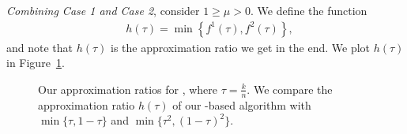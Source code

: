 \emph{Combining Case 1 and Case 2}, consider $1 \geq \mu > 0$. 
We define the function 
\begin{equation*}
	\begin{aligned}
&h(\tau) = \min\left\{f^1(\tau), f^2(\tau) \right\},
	\end{aligned}
\end{equation*}
and note that $h(\tau)$ is the approximation ratio we get in the end. We plot
$h(\tau)$ in Figure~\ref{fig:cut-ratio}. 


\begin{figure}
\centering
{}
\caption{Our approximation ratios for \maxcutkc, where $\tau = \frac{k}{n}$. We
compare the approximation ratio $h(\tau)$ of our \sdp-based algorithm with $\min\{\tau, 1-\tau\}$ and $\min\{\tau^2, (1-\tau)^2\}$.}
\label{fig:cut-ratio}
\end{figure}

\clearpage 
